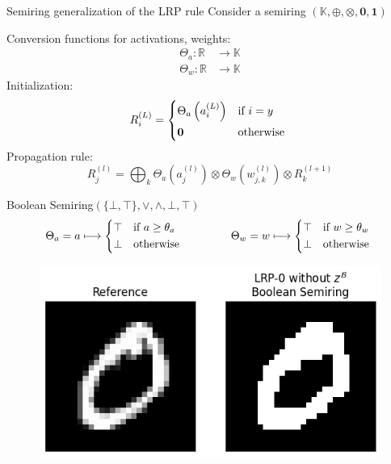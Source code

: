 \documentclass[aspectratio=169]{beamer}
\theoremstyle{definition}
\begin{document}
\begin{frame}{Semiring generalization of the LRP rule}
    Consider a semiring $(\mathbb{K}, \oplus, \otimes, \mathbf{0}, \mathbf{1})$

    Conversion functions for activations, weights:
    \begin{equation*}
        \begin{aligned}
            \Theta_a : \mathbb{R} &\longrightarrow \mathbb{K}\\
            \Theta_w : \mathbb{R} &\longrightarrow \mathbb{K}
        \end{aligned}
    \end{equation*}
    Initialization:
    \begin{equation}
        R^{(L)}_i = \begin{cases*}
            \Theta_a\left(a^{(L)}_i\right) & if $i = y$\\
            \mathbf{0} & otherwise
        \end{cases*}
    \end{equation}
    Propagation rule:
    \begin{equation}
        R^{(l)}_j = \bigoplus_k \Theta_a\left(a^{(l)}_j\right) \otimes \Theta_w\left(w_{j, k}^{(l)}\right) \otimes R^{(l+1)}_k
    \end{equation}
\end{frame}

\begin{frame}{Boolean Semiring}{\large $(\{\bot, \top\}, \lor, \land, \bot, \top)$}
    \begin{equation*}
        \Theta_a = a \longmapsto \begin{cases*}
            \top & if $a\geq\theta_a$\\
            \bot & otherwise
        \end{cases*}
        \qquad\qquad
        \Theta_w = w \longmapsto \begin{cases*}
            \top & if $w\geq\theta_w$\\
            \bot & otherwise
        \end{cases*}
    \end{equation*}

    \begin{figure}[H]
        \centering
        \includegraphics[width=.5\textwidth]{boolean.png}
    \end{figure}
\end{frame}
\end{document}
